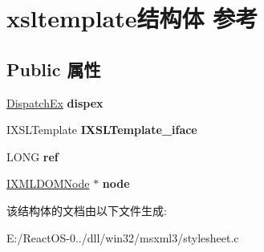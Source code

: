 \hypertarget{structxsltemplate}{}\section{xsltemplate结构体 参考}
\label{structxsltemplate}
\subsection*{Public 属性}
\begin{DoxyCompactItemize}
\item 
\mbox{\label{structxsltemplate_aa6fc6225dd1ca6e84888ca49a092f33d}} 
\hyperlink{struct_dispatch_ex}{Dispatch\+Ex} {\bfseries dispex}
\item 
\mbox{\label{structxsltemplate_aaa265b859c2b0ae4fc38d26c0c9dbc4a}} 
I\+X\+S\+L\+Template {\bfseries I\+X\+S\+L\+Template\+\_\+iface}
\item 
\mbox{\label{structxsltemplate_ac031b2542244976ffacbf389ec35b8ca}} 
L\+O\+NG {\bfseries ref}
\item 
\mbox{\label{structxsltemplate_a057076ac12c7e222fcf956f8c09df2a0}} 
\hyperlink{interface_i_x_m_l_d_o_m_node}{I\+X\+M\+L\+D\+O\+M\+Node} $\ast$ {\bfseries node}
\end{DoxyCompactItemize}


该结构体的文档由以下文件生成\+:\begin{DoxyCompactItemize}
\item 
E\+:/\+React\+O\+S-\/0../dll/win32/msxml3/stylesheet.\+c\end{DoxyCompactItemize}
